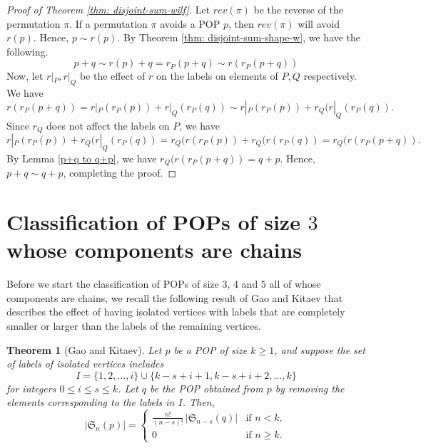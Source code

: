 \documentclass[12pt, english, a4paper]{article}
\newcommand{\blue}[1]{\textcolor{blue}{#1}}
\newcommand{\Av}{\mathfrak{S}}
\theoremstyle{plain}
\newtheorem{theorem}{Theorem}
\theoremstyle{definition}
\theoremstyle{remark}
\begin{document}
\begin{proof}[Proof of Theorem \ref{thm: disjoint-sum-wilf}]
    Let $rev(\pi)$ be the reverse of the permutation $\pi$. 
    If a permutation $\pi$ avoids a POP $p$, then $rev(\pi) $ will avoid $r(p)$. Hence, $p \sim r(p)$. By Theorem \ref{thm: disjoint-sum-shape-w}, we have the following. 
    $$p+q \sim r(p)+q =r_P(p+q) \sim r(r_P(p+q))$$ 
Now, let $r|_P, r|_Q$ be the effect of $r$ on the labels on elements of $P,Q$ respectively. We have
    $$r(r_P(p+q)) = r|_P(r_P(p))+ r|_Q(r_P(q)) \sim r|_P(r_P(p))+ r_Q(r|_Q(r_P(q)).$$ 
    Since $r_Q$ does not affect the labels on $P$, we have
    $$r|_P(r_P(p))+ r_Q(r|_Q(r_P(q))=r_Q(r(r_P(p))+ r_Q(r(r_P(q))=r_Q(r(r_P(p+q)).$$ By Lemma \ref{p+q to q+p}, we have $r_Q(r(r_P(p+q))=q+p$. Hence, $p+q \sim q+p$, completing the proof.
\end{proof}


\section{Classification of POPs of size $3$ whose components are chains }\label{sec: len3}

% 

Before we start the classification of POPs of size $3$, $4$ and $5$ all of whose components are chains, we recall the following result of Gao and Kitaev  \cite[Theorem 4]{gao-kitaev-length-4-5-pops} 
that describes the effect of having isolated vertices with labels that are completely smaller or larger than the labels of the remaining vertices.


\begin{theorem}[Gao and Kitaev]%
\label{iso_ver_beginning_end}
    Let \( p \) be a POP of size \( k \geq 1 \), and suppose the set of labels of isolated vertices includes
\[
I = \{1, 2, \ldots, i\} \cup \{k - s + i + 1, k - s + i + 2, \ldots, k\}
\]
for integers \( 0 \leq i \leq s \leq k \). Let \( q \) be the POP obtained from \( p \) by removing the elements corresponding to the labels in \( I \). Then,
\[
|\Av_n(p)| = 
\begin{cases} 
\displaystyle \frac{n!}{(n - s)!} \, |\Av_{n - s}(q)| & \text{if } n < k, \\[10pt]
0 & \text{if } n \geq k.
\end{cases}
\]
\end{theorem}
\end{document}
